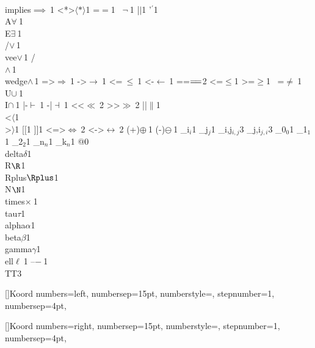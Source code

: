 {    {\\implies}{{$\implies\ $}}1
    {<*>}{{$\langle*\rangle$}}1
    {=}{{$=$}}1
    {~}{{$\neg\ $}}1
    {|}{{$\mid$}}1
    {'}{{$^\prime$}}1
    {\\A}{{$\forall\ $}}1
    {\\E}{{$\exists\ $}}1
    {\\/}{{$\vee\,$}}1
    {\\vee}{{$\vee\,$}}1
    {/\\}{{$\wedge\,$}}1
    {\\wedge}{{$\wedge\,$}}1
    {=>}{{$\Rightarrow\ $}}1
    {->}{{$\rightarrow\ $}}1
    {<=}{{$\ \leq\ $}}1
    {<-}{{$\leftarrow\ $}}1
    {==}{{$=\mathrel{\mkern-3mu}=$}}2
    {<=}{{$\leq$}}1
    {>=}{{$\geq$}}1
    {~=}{{$\neq\ $}}1
    {\\U}{{$\cup\ $}}1
    {\\I}{{$\cap\ $}}1
    {|-}{{$\vdash\ $}}1
    {-|}{{$\dashv\ $}}1
    {<<}{{$\ll\ $}}2
    {>>}{{$\gg\ $}}2
    {||}{{$\|$}}1
    {\\<}{{$\langle$}}1
    {\\>}{{$\rangle$}}1
    {[}{{$[$}}1
    {]}{{$]$}}1
    {<=>}{{$\Leftrightarrow\ $}}2
    {<->}{{$\leftrightarrow\ $}}2
    {(+)}{{$\oplus\ $}}1
    {(-)}{{$\ominus\ $}}1
    {_i}{{$_{i}$}}1
    {_j}{{$_{j}$}}1
    {_{i,j}}{{$_{i,j}$}}3
    {_{j,i}}{{$_{j,i}$}}3
    {_0}{{$_0$}}1
    {_1}{{$_1$}}1
    {_2}{{$_2$}}1
    {_n}{{$_n$}}1
    {_k}{{$_n$}}1
    {@}{{}}0
    {\\delta}{{$\delta$}}1
    {\\R}{{$\R$}}1
    {\\Rplus}{{$\Rplus$}}1
    {\\N}{{$\N$}}1
    {\\times}{{$\times\ $}}1
    {\\tau}{{$\tau$}}1
    {\\alpha}{{$\alpha$}}1
    {\\beta}{{$\beta$}}1
    {\\gamma}{{$\gamma$}}1
    {\\ell}{{$\ell\ $}}1
    {--}{{$-\ $}}1
    {\\TT}{{\hspace{1.5em}}}3
}
	
	
	[]{Koord}
	{
		numbers=left,
		numbersep=15pt,
		numberstyle=\tiny,
		stepnumber=1,
		numbersep=4pt,
	}
	
	[]{Koord}
	{
		numbers=right,
		numbersep=15pt,
		numberstyle=\tiny,
		stepnumber=1,
		numbersep=4pt,
	}


